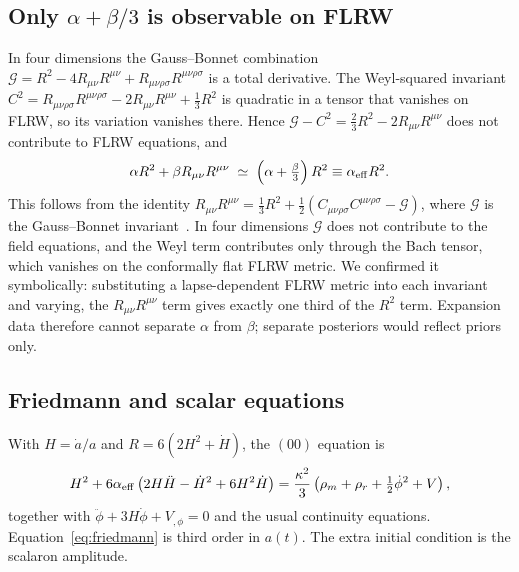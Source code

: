 \documentclass[11pt,a4paper]{article}
\newcommand{\aeff}{\alpha_{\rm eff}}
\begin{document}
\subsection{Only $\alpha+\beta/3$ is observable on FLRW}
In four dimensions the Gauss--Bonnet combination $\mathcal G=R^2-4R_{\mu\nu}R^{\mu\nu}+R_{\mu\nu\rho\sigma}R^{\mu\nu\rho\sigma}$ is a total derivative. The Weyl-squared invariant $C^2=R_{\mu\nu\rho\sigma}R^{\mu\nu\rho\sigma}-2R_{\mu\nu}R^{\mu\nu}+\tfrac13R^2$ is quadratic in a tensor that vanishes on FLRW, so its variation vanishes there.
Hence $\mathcal G-C^2=\tfrac23R^2-2R_{\mu\nu}R^{\mu\nu}$ does not contribute to FLRW equations, and
\begin{equation}
\alpha R^2+\beta R_{\mu\nu}R^{\mu\nu}\;\simeq\;\left(\alpha+\tfrac{\beta}{3}\right)R^2\equiv\aeff R^2 .
\end{equation}
This follows from the identity $R_{\mu\nu}R^{\mu\nu}=\tfrac13R^2+\tfrac12(C_{\mu\nu\rho\sigma}C^{\mu\nu\rho\sigma}-\mathcal{G})$, where $\mathcal{G}$ is the Gauss--Bonnet invariant~\cite{1002.4928}. In four dimensions $\mathcal{G}$ does not contribute to the field equations, and the Weyl term contributes only through the Bach tensor, which vanishes on the conformally flat FLRW metric. We confirmed it symbolically: substituting a lapse-dependent FLRW metric into each invariant and varying, the $R_{\mu\nu}R^{\mu\nu}$ term gives exactly one third of the $R^2$ term. Expansion data therefore cannot separate $\alpha$ from $\beta$; separate posteriors would reflect priors only.

\subsection{Friedmann and scalar equations}
With $H=\dot a/a$ and $R=6(2H^2+\dot H)$, the $(00)$ equation is
\begin{equation}
H^2+6\aeff\left(2H\ddot H-\dot H^2+6H^2\dot H\right)=\frac{\kappa^2}{3}\left(\rho_m+\rho_r+\tfrac12\dot\phi^2+V\right),
\label{eq:friedmann}
\end{equation}
together with $\ddot\phi+3H\dot\phi+V_{,\phi}=0$ and the usual continuity equations. Equation~\eqref{eq:friedmann} is third order in $a(t)$. The extra initial condition is the scalaron amplitude.
\end{document}
